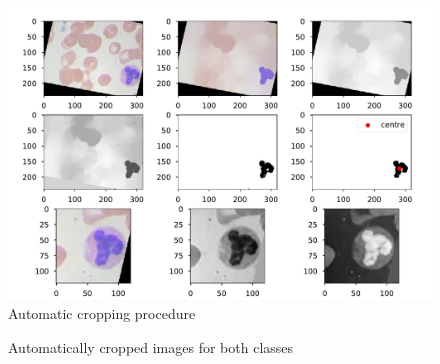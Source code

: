 \documentclass[10pt,a4paper]{article}
\begin{document}
\begin{figure}
  \centering
  \includegraphics[width=1\textwidth]{Graphs/Find_center.pdf}
  \caption{Automatic cropping procedure}\label{find_centre}
\end{figure}


\begin{figure}
  \centering
  \hfill
  \caption{Automatically cropped images for both classes}\label{cropped}
\end{figure}
\end{document}
